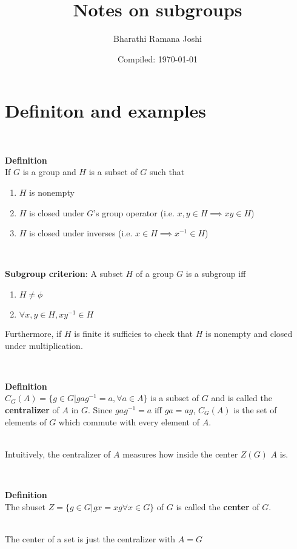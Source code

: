 \documentclass[titlepage, 12pt]{article}
\newenvironment{definition}[1][Definition]
    {\leavevmode \\ \begin{mdframed}[backgroundcolor=gray!20] \textbf{#1} \\}
    {  \end{mdframed}\leavevmode \\}
\begin{document}
\title{Notes on subgroups}

\author{Bharathi Ramana Joshi}

\date{Compiled: \today}

\maketitle

\newpage

\section{Definiton and examples}
\begin{definition}
    If $G$ is a group and $H$ is a subset of $G$ such that
    \begin{enumerate}
        \item $H$ is nonempty
        \item $H$ is closed under $G$'s group operator (i.e. $x, y\in H\implies
            xy\in H$)
        \item $H$ is closed under inverses (i.e. $x\in H \implies x^{-1} \in H$)
    \end{enumerate}
\end{definition}

\textbf{Subgroup criterion}: A subset $H$ of a group $G$ is a subgroup iff
\begin{enumerate}
    \item $H\neq\phi$
    \item $\forall x, y\in H, xy^{-1}\in H$
\end{enumerate}
Furthermore, if $H$ is finite it sufficies to check that $H$ is nonempty and
closed under multiplication.

\begin{definition}
    $C_G(A) = \{g\in G| gag^{-1} = a,\forall a\in A\}$ is a subset of $G$ and
    is called the \textbf{centralizer} of $A$ in $G$. Since $gag^{-1} = a$ iff
    $ga = ag$, $C_G(A)$ is the set of elements of $G$ which commute with every
    element of $A$.
\end{definition}
Intuitively, the centralizer of $A$ measures how inside the center $Z(G)$ $A$
is.

\begin{definition}
    The sbuset $Z = \{g\in G| gx = xg\forall x\in G\}$ of $G$ is called the
    \textbf{center} of $G$.
\end{definition}
The center of a set is just the centralizer with $A = G$
\end{document}

